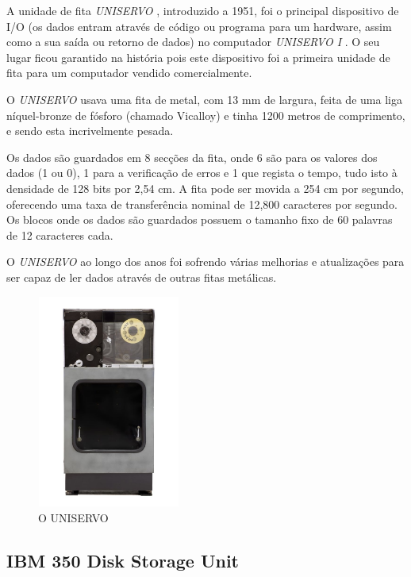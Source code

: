 \documentclass{report}
\begin{document}
	A unidade de fita \textit{UNISERVO}  , introduzido a 1951, foi o principal dispositivo de I/O (os dados entram através de código ou programa para um hardware, assim como a sua saída ou retorno de dados) no computador \textit{UNISERVO I} . O seu lugar ficou garantido na história pois este dispositivo foi a primeira unidade de fita para um computador vendido comercialmente. 
\vspace{1mm}	
	
	O \textit{UNISERVO}  usava uma fita de metal, com 13 mm de largura, feita de uma liga níquel-bronze de fósforo (chamado Vicalloy) e tinha 1200 metros de comprimento, e sendo esta incrivelmente pesada.
\vspace{1mm}
	
	Os dados são guardados em 8 secções da fita, onde 6 são para os valores dos dados (1 ou 0), 1 para a verificação de erros e 1 que regista o tempo, tudo isto à densidade de 128 bits por 2,54 cm. A fita pode ser movida a 254 cm por segundo, oferecendo uma taxa de transferência nominal de 12,800 caracteres por segundo. Os blocos onde os dados são guardados possuem o tamanho fixo de 60 palavras de 12 caracteres cada.
\vspace{1mm}
	
	O \textit{UNISERVO}  ao longo dos anos foi sofrendo várias melhorias e atualizações para ser capaz de ler dados através de outras fitas metálicas.

\begin{figure}[h]
		\centering
		\includegraphics[width=4.7cm, height=7cm]{uniservo.jpg}
		\caption{O UNISERVO}
		\end{figure}
	
\newpage
		\subsection{IBM 350 Disk Storage Unit}
		
\end{document}
